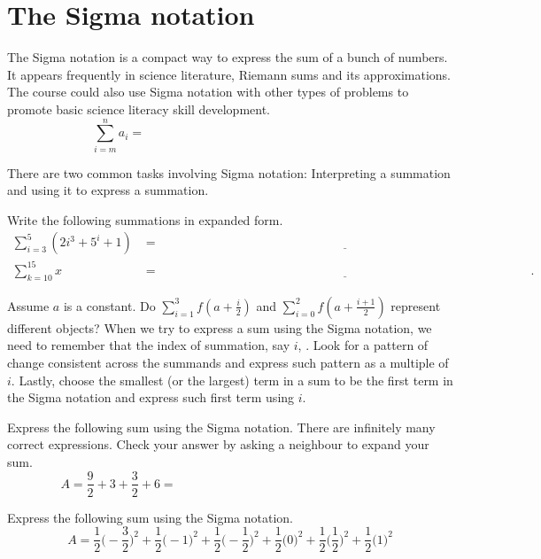 \documentclass[../main.tex]{subfiles}
\begin{document}
 \section{The Sigma notation}
The Sigma notation is a compact way to express the sum of a bunch of numbers. It appears frequently in science literature, Riemann sums and its approximations. The course could also use Sigma notation with other types of problems to promote basic science literacy skill development.
{\huge \[ \sum_{i=m}^{n} a_{i} = \hspace{3in}\]}

There are two common tasks involving Sigma notation: Interpreting a summation and using it to express a summation.
\begin{example} \label{ex:sigma-notation-read)}
  Write the following summations in expanded form.
  \begin{align*}
    \sum_{i=3}^{5} (2i^{3} + 5^{i} + 1)
      &= \underline{\hspace{5in}} \\[3ex]
      \sum_{k=10}^{15} x
      &= \underline{\hspace{5in}}.
  \end{align*}
\end{example}
\faComment{} Assume \(a\) is a constant. Do \(\sum_{i=1}^{3}f\left(a + \frac{i}{2}\right)\) and \(\sum_{i=0}^{2}f\left(a + \frac{i+1}{2}\right)\) represent different objects? 
\clearpage
When we try to express a sum using the Sigma notation, we need to remember that the index of summation, say \(i\), . Look for a pattern of change consistent across the summands and express such pattern as a multiple of \(i\).  Lastly, choose the smallest (or the largest) term in a sum to be the first term in the Sigma notation and express such first term using \(i\).

\begin{example}
  Express the following sum using the Sigma notation. There are infinitely many correct expressions. Check your answer by asking a neighbour to expand your sum.
  \[
    A = \frac{9}{2} + 3 + \frac{3}{2} + 6 = \hspace{3in}
  \]
\end{example}

\begin{example}
  Express the following sum using the Sigma notation. 
  \[
    A = \frac{1}{2} \bigg( -\frac{3}{2} \bigg)^{2} + \frac{1}{2} \bigg( -1 \bigg)^{2} + \frac{1}{2} \bigg( -\frac{1}{2} \bigg)^{2} + \frac{1}{2} \bigg( 0 \bigg)^{2} + \frac{1}{2} \bigg( \frac{1}{2} \bigg)^{2} + \frac{1}{2} \bigg( 1 \bigg)^{2}
  \]
\end{example}
\vfill
\end{document}
